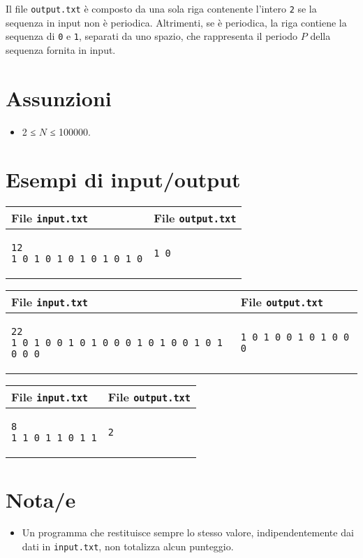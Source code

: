 \documentclass[a4paper,11pt]{article}
\begin{document}
Il file \texttt{output.txt} è composto da una sola riga
contenente l'intero \texttt{2} se la sequenza in input non è
periodica. Altrimenti, se è periodica, la riga contiene la sequenza
di \texttt{0} e \texttt{1}, separati da uno spazio, che
rappresenta il periodo $P$ della sequenza fornita in input.

  \section*{Assunzioni}
  \begin{itemize}
  
    \item  2 ≤ $N$ ≤ 100000.
  \end{itemize}

\section*{Esempi di input/output}

  
    \noindent
    \begin{tabular}{p{11cm}|p{5cm}}
    \toprule
    \textbf{File \texttt{input.txt}}
    & \textbf{File \texttt{output.txt}}
    \\
    \midrule
    \scriptsize
    \begin{verbatim}
12
1 0 1 0 1 0 1 0 1 0 1 0
\end{verbatim}
    &
    \scriptsize
    \begin{verbatim}
1 0
\end{verbatim}
    \\
    \bottomrule
    \end{tabular}
  
    \noindent
    \begin{tabular}{p{11cm}|p{5cm}}
    \toprule
    \textbf{File \texttt{input.txt}}
    & \textbf{File \texttt{output.txt}}
    \\
    \midrule
    \scriptsize
    \begin{verbatim}
22
1 0 1 0 0 1 0 1 0 0 0 1 0 1 0 0 1 0 1 0 0 0
\end{verbatim}
    &
    \scriptsize
    \begin{verbatim}
1 0 1 0 0 1 0 1 0 0 0
\end{verbatim}
    \\
    \bottomrule
    \end{tabular}
  
    \noindent
    \begin{tabular}{p{11cm}|p{5cm}}
    \toprule
    \textbf{File \texttt{input.txt}}
    & \textbf{File \texttt{output.txt}}
    \\
    \midrule
    \scriptsize
    \begin{verbatim}
8
1 1 0 1 1 0 1 1
\end{verbatim}
    &
    \scriptsize
    \begin{verbatim}
2
\end{verbatim}
    \\
    \bottomrule
    \end{tabular}
  
\section*{Nota/e}
\begin{itemize}
  
    \item Un programma che restituisce sempre lo stesso valore,
indipendentemente dai dati in \texttt{input.txt}, non totalizza
alcun punteggio.
\end{itemize}
\end{document}
